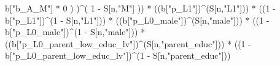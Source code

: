 \documentclass[
]{book}
\newenvironment{Shaded}{\begin{snugshade}}{\end{snugshade}}
\newcommand{\DecValTok}[1]{\textcolor[rgb]{0.00,0.00,0.81}{#1}}
\newcommand{\NormalTok}[1]{#1}
\newcommand{\SpecialCharTok}[1]{\textcolor[rgb]{0.00,0.00,0.00}{#1}}
\newcommand{\StringTok}[1]{\textcolor[rgb]{0.31,0.60,0.02}{#1}}
\begin{document}
\begin{Shaded}
\begin{Highlighting}[]
\NormalTok{                b[}\StringTok{"b\_A\_M"}\NormalTok{] }\SpecialCharTok{*} \DecValTok{0}\NormalTok{ ) )}\SpecialCharTok{\^{}}\NormalTok{( }\DecValTok{1} \SpecialCharTok{{-}}\NormalTok{ S[n,}\StringTok{"M"}\NormalTok{] )) }\SpecialCharTok{*}
\NormalTok{      ((b[}\StringTok{"p\_L1"}\NormalTok{])}\SpecialCharTok{\^{}}\NormalTok{(S[n,}\StringTok{"L1"}\NormalTok{])) }\SpecialCharTok{*}
\NormalTok{      ((}\DecValTok{1} \SpecialCharTok{{-}}\NormalTok{ b[}\StringTok{"p\_L1"}\NormalTok{])}\SpecialCharTok{\^{}}\NormalTok{(}\DecValTok{1} \SpecialCharTok{{-}}\NormalTok{ S[n,}\StringTok{"L1"}\NormalTok{])) }\SpecialCharTok{*}
\NormalTok{      ((b[}\StringTok{"p\_L0\_male"}\NormalTok{])}\SpecialCharTok{\^{}}\NormalTok{(S[n,}\StringTok{"male"}\NormalTok{])) }\SpecialCharTok{*} 
\NormalTok{      ((}\DecValTok{1} \SpecialCharTok{{-}}\NormalTok{ b[}\StringTok{"p\_L0\_male"}\NormalTok{])}\SpecialCharTok{\^{}}\NormalTok{(}\DecValTok{1} \SpecialCharTok{{-}}\NormalTok{ S[n,}\StringTok{"male"}\NormalTok{])) }\SpecialCharTok{*} 
\NormalTok{      ((b[}\StringTok{"p\_L0\_parent\_low\_educ\_lv"}\NormalTok{])}\SpecialCharTok{\^{}}\NormalTok{(S[n,}\StringTok{"parent\_educ"}\NormalTok{])) }\SpecialCharTok{*}
\NormalTok{      ((}\DecValTok{1} \SpecialCharTok{{-}}\NormalTok{ b[}\StringTok{"p\_L0\_parent\_low\_educ\_lv"}\NormalTok{])}\SpecialCharTok{\^{}}\NormalTok{(}\DecValTok{1} \SpecialCharTok{{-}}\NormalTok{ S[n,}\StringTok{"parent\_educ"}\NormalTok{])) }
    

\end{Highlighting}
\end{Shaded}
\end{document}
